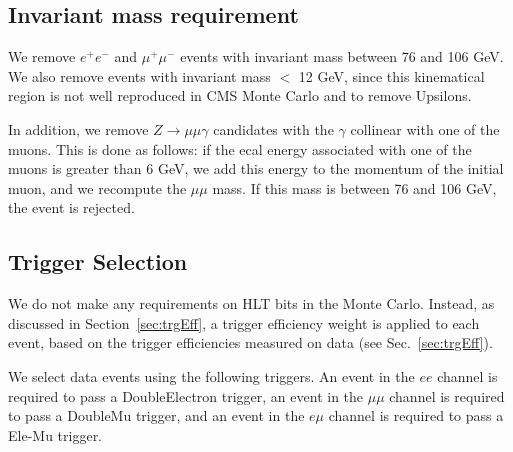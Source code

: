 \subsection{Invariant mass requirement}
\label{sec:zveto}

We remove $e^+e^-$ and $\mu^+ \mu^-$ events with invariant 
mass between 76 and 106 GeV.  We also remove events
with invariant mass $<$ 12 GeV, since this kinematical region is 
not well reproduced in CMS Monte Carlo and to remove Upsilons.

In addition, we remove $Z \to \mu\mu\gamma$
candidates with the $\gamma$ collinear with one of the muons.  This is
done as follows:
if the ecal energy associated with one of the muons is greater than 6 GeV,
we add this energy to the momentum of the initial muon, and we recompute
the $\mu\mu$ mass.  If this mass is between 76 and 106 GeV, the event is rejected.


\subsection{Trigger Selection}
\label{sec:trigSel}

We do not make any requirements on HLT bits in the Monte Carlo.
Instead, as discussed in 
Section~\ref{sec:trgEff}, a trigger efficiency weight is applied
to each event, based on the trigger efficiencies measured on data (see Sec.~\ref{sec:trgEff}).

We select data events using the following triggers. An event in the $ee$ channel is required
to pass a DoubleElectron trigger, an event in the $\mu\mu$ channel is required to pass a 
DoubleMu trigger, and an event in the $e\mu$ channel is required to pass a Ele-Mu trigger.

